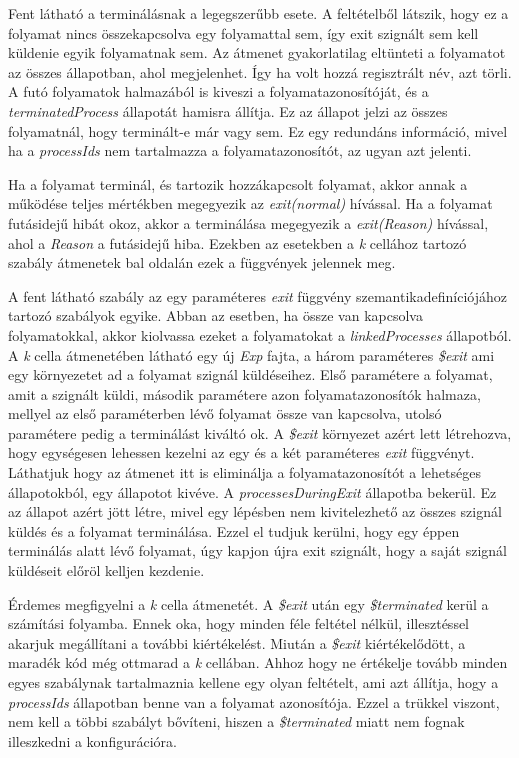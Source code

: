 

Fent látható a terminálásnak a legegszerűbb esete. A feltételből látszik, hogy ez a folyamat nincs összekapcsolva egy folyamattal sem, így exit szignált sem kell küldenie egyik folyamatnak sem. Az átmenet gyakorlatilag eltünteti a folyamatot az összes állapotban, ahol megjelenhet. Így ha volt hozzá regisztrált név, azt törli. A futó folyamatok halmazából is kiveszi a folyamatazonosítóját, és a \textit{terminatedProcess} állapotát hamisra állítja. Ez az állapot jelzi az összes folyamatnál, hogy terminált-e már vagy sem. Ez egy redundáns információ, mivel ha a \textit{processIds} nem tartalmazza a folyamatazonosítót, az ugyan azt jelenti.

Ha a folyamat terminál, és tartozik hozzákapcsolt folyamat, akkor annak a működése teljes mértékben megegyezik az \textit{exit(normal)} hívással. Ha a folyamat futásidejű hibát okoz, akkor a terminálása megegyezik a \textit{exit(Reason)} hívással, ahol a \textit{Reason} a futásidejű hiba. Ezekben az esetekben a \textit{k} cellához tartozó szabály átmenetek bal oldalán ezek a függvények jelennek meg.



A fent látható szabály az egy paraméteres \textit{exit} függvény szemantikadefiníciójához tartozó szabályok egyike. Abban az esetben, ha össze van kapcsolva folyamatokkal, akkor kiolvassa ezeket a folyamatokat a \textit{linkedProcesses} állapotból. A \textit{k} cella átmenetében látható egy új \textit{Exp} fajta, a három paraméteres \textit{\$exit} ami egy környezetet ad a folyamat szignál küldéseihez. Első paramétere a folyamat, amit a szignált küldi, második paramétere azon folyamatazonosítók halmaza, mellyel az első paraméterben lévő folyamat össze van kapcsolva, utolsó paramétere pedig a terminálást kiváltó ok. A \textit{\$exit} környezet azért lett létrehozva, hogy egységesen lehessen kezelni az egy és a két paraméteres \textit{exit} függvényt. Láthatjuk hogy az átmenet itt is eliminálja a folyamatazonosítót a lehetséges állapotokból, egy állapotot kivéve. A \textit{processesDuringExit} állapotba bekerül. Ez az állapot azért jött létre, mivel egy lépésben nem kivitelezhető az összes szignál küldés és a folyamat terminálása. Ezzel el tudjuk kerülni, hogy egy éppen terminálás alatt lévő folyamat, úgy kapjon újra exit szignált, hogy a saját szignál küldéseit előröl kelljen kezdenie.

Érdemes megfigyelni a \textit{k} cella átmenetét. A \textit{\$exit} után egy \textit{\$terminated} kerül a számítási folyamba. Ennek oka, hogy minden féle feltétel nélkül, illesztéssel akarjuk megállítani a további kiértékelést. Miután a \textit{\$exit} kiértékelődött, a maradék kód még ottmarad a \textit{k} cellában. Ahhoz hogy ne értékelje tovább minden egyes szabálynak tartalmaznia kellene egy olyan feltételt, ami azt állítja, hogy a \textit{processIds} állapotban benne van a folyamat azonosítója. Ezzel a trükkel viszont, nem kell a többi szabályt bővíteni, hiszen a \textit{\$terminated} miatt nem fognak illeszkedni a konfigurációra.

